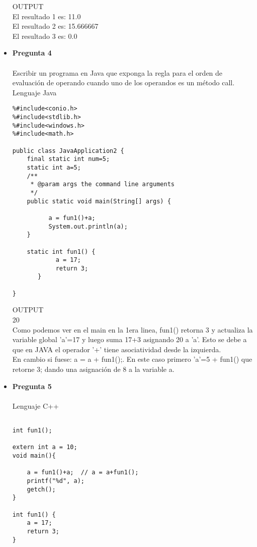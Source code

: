 \documentclass[12pt,oneside]{article}
\begin{document}
\begin{itemize}
OUTPUT\\
El resultado 1 es: 11.0\\
El resultado 2 es: 15.666667\\
El resultado 3 es: 0.0\\


\item {\bf Pregunta 4} \\\\
Escribir un programa en Java que exponga la regla para el orden de evaluación de operando cuando uno de los operandos es un método call.\\
Lenguaje Java\\
\begin{lstlisting}[frame=single]  % Start your code-block
%#include<stdio.h>
%#include<conio.h>
%#include<stdlib.h>
%#include<windows.h>
%#include<math.h>

public class JavaApplication2 {
    final static int num=5;
    static int a=5;
    /**
     * @param args the command line arguments
     */
    public static void main(String[] args) {
        
          a = fun1()+a; 
          System.out.println(a); 
    }

    static int fun1() {
            a = 17;
            return 3;
       }

}

\end{lstlisting}
OUTPUT\\
20\\
Como podemos ver en el main en la 1era linea, fun1() retorna 3 y actualiza la variable global 'a'=17 y luego suma 17+3 asignando 20 a 'a'. Esto se debe a que en JAVA el operador '+' tiene asociatividad desde la izquierda.\\
En cambio si fuese:  a = a + fun1();. En este caso primero 'a'=5 + fun1() que retorne 3; dando una asignación de 8 a la variable a.

\item {\bf Pregunta 5} \\\\
Lenguaje C++
\begin{lstlisting}[frame=single]  % Start your code-block

int fun1();

extern int a = 10;
void main(){
	
	a = fun1()+a;  // a = a+fun1();
	printf("%d", a);
	getch();
}

int fun1() {
	a = 17;
	return 3;
}
\end{lstlisting}


\end{itemize}
\end{document}
